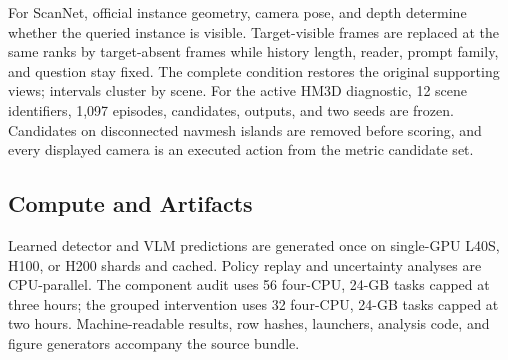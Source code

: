 \documentclass{article}
\begin{document}
For ScanNet, official instance geometry, camera pose, and depth determine whether the queried instance is visible. Target-visible frames are replaced at the same ranks by target-absent frames while history length, reader, prompt family, and question stay fixed. The complete condition restores the original supporting views; intervals cluster by scene. For the active HM3D diagnostic, 12 scene identifiers, 1,097 episodes, candidates, outputs, and two seeds are frozen. Candidates on disconnected navmesh islands are removed before scoring, and every displayed camera is an executed action from the metric candidate set.

\subsection{Compute and Artifacts}
Learned detector and VLM predictions are generated once on single-GPU L40S, H100, or H200 shards and cached. Policy replay and uncertainty analyses are CPU-parallel. The component audit uses 56 four-CPU, 24-GB tasks capped at three hours; the grouped intervention uses 32 four-CPU, 24-GB tasks capped at two hours. Machine-readable results, row hashes, launchers, analysis code, and figure generators accompany the source bundle.


\end{document}
